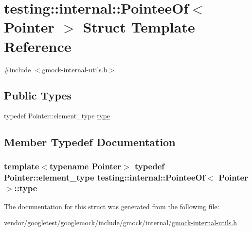 \hypertarget{structtesting_1_1internal_1_1PointeeOf}{}\section{testing\+:\+:internal\+:\+:Pointee\+Of$<$ Pointer $>$ Struct Template Reference}
\label{structtesting_1_1internal_1_1PointeeOf}


{\ttfamily \#include $<$gmock-\/internal-\/utils.\+h$>$}

\subsection*{Public Types}
\begin{DoxyCompactItemize}
\item 
typedef Pointer\+::element\+\_\+type \hyperlink{structtesting_1_1internal_1_1PointeeOf_aca4d92c8f978e47a8695e82cffc11837}{type}
\end{DoxyCompactItemize}


\subsection{Member Typedef Documentation}
\subsubsection[{\texorpdfstring{type}{type}}]{\setlength{\rightskip}{0pt plus 5cm}template$<$typename Pointer$>$ typedef Pointer\+::element\+\_\+type {\bf testing\+::internal\+::\+Pointee\+Of}$<$ Pointer $>$\+::{\bf type}}\hypertarget{structtesting_1_1internal_1_1PointeeOf_aca4d92c8f978e47a8695e82cffc11837}{}\label{structtesting_1_1internal_1_1PointeeOf_aca4d92c8f978e47a8695e82cffc11837}


The documentation for this struct was generated from the following file\+:\begin{DoxyCompactItemize}
\item 
vendor/googletest/googlemock/include/gmock/internal/\hyperlink{gmock-internal-utils_8h}{gmock-\/internal-\/utils.\+h}\end{DoxyCompactItemize}
